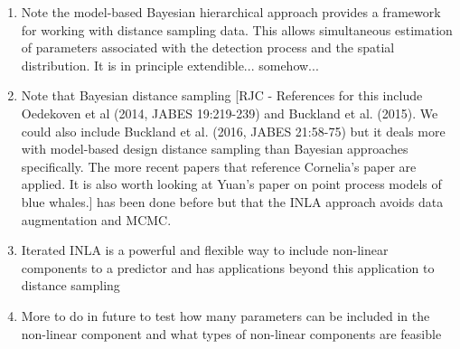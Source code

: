 \documentclass[preprint,12pt]{elsarticle}
\begin{document}
\begin{enumerate}
	\item Note the model-based Bayesian hierarchical approach provides a framework for working with distance sampling data.  This allows simultaneous estimation of parameters associated with the detection process and the spatial distribution.  It is in principle extendible... somehow...
	\item Note that Bayesian distance sampling [RJC - References for this include Oedekoven et al (2014, JABES 19:219-239) and Buckland et al. (2015). We could also include Buckland et al. (2016, JABES 21:58-75) but it deals more with model-based design distance sampling than Bayesian approaches specifically. The more recent papers that reference Cornelia's paper are applied. It is also worth looking at Yuan's paper on point process models of blue whales.] has been done before but that the INLA approach avoids data augmentation and MCMC.
	\item Iterated INLA is a powerful and flexible way to include non-linear components to a predictor and has applications beyond this application to distance sampling
	\item More to do in future to test how many parameters can be included in the non-linear component and what types of non-linear components are feasible

\end{enumerate}



\end{document}
